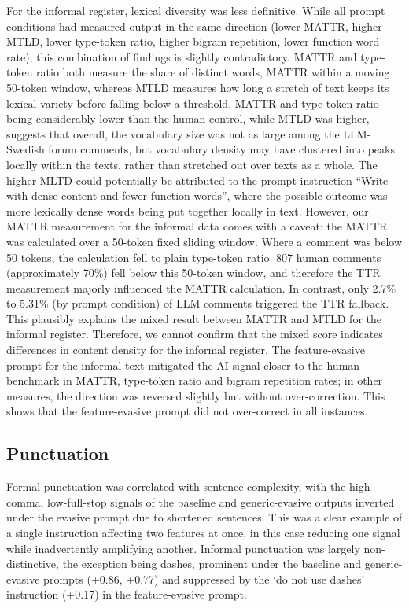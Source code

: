 \documentclass[thesis]{cluu}
\begin{document}
For the informal register, lexical diversity was less definitive. While all prompt conditions had measured output in the same direction (lower MATTR, higher MTLD, lower type-token ratio, higher bigram repetition, lower function word rate), this combination of findings is slightly contradictory. MATTR and type-token ratio both measure the share of distinct words, MATTR within a moving 50-token window, whereas MTLD measures how long a stretch of text keeps its lexical variety before falling below a threshold. MATTR and type-token ratio being considerably lower than the human control, while MTLD was higher, suggests that overall, the vocabulary size was not as large among the LLM-Swedish forum comments, but vocabulary density may have clustered into peaks locally within the texts, rather than stretched out over texts as a whole. The higher MLTD could potentially be attributed to the prompt instruction ``Write with dense content and fewer function words'', where the possible outcome was more lexically dense words being put together locally in text. However, our MATTR measurement for the informal data comes with a caveat: the MATTR was calculated over a 50-token fixed sliding window. Where a comment was below 50 tokens, the calculation fell to plain type-token ratio. 807 human comments (approximately 70\%) fell below this 50-token window, and therefore the TTR measurement majorly influenced the MATTR calculation. In contrast, only 2.7\% to 5.31\% (by prompt condition) of LLM comments triggered the TTR fallback. This plausibly explains the mixed result between MATTR and MTLD for the informal register. Therefore, we cannot confirm that the mixed score indicates differences in content density for the informal register.  The feature-evasive prompt for the informal text mitigated the AI signal closer to the human benchmark in MATTR, type-token ratio and bigram repetition rates; in other measures, the direction was reversed slightly but without over-correction. This shows that the feature-evasive prompt did not over-correct in all instances.




\subsection{Punctuation} Formal punctuation was correlated with sentence complexity, with the high-comma, low-full-stop signals of the baseline and generic-evasive outputs inverted under the evasive prompt due to shortened sentences. This was a clear example of a single instruction affecting two features at once, in this case reducing one signal while inadvertently amplifying another. Informal punctuation was largely non-distinctive, the exception being dashes, prominent under the baseline and generic-evasive prompts (+0.86, +0.77) and suppressed by the `do not use dashes' instruction (+0.17) in the feature-evasive prompt.
\end{document}

